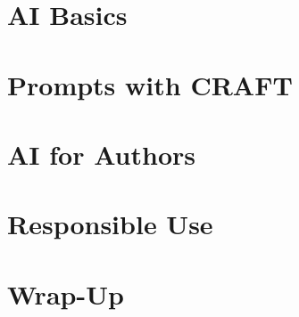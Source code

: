 
\section[Core]{AI Basics}



\section[Prompts]{Prompts with CRAFT}


\section[Authors]{AI for Authors}


% 

% 

% 

\section[Responsible]{Responsible Use}


\section[WrapUp]{Wrap-Up}

